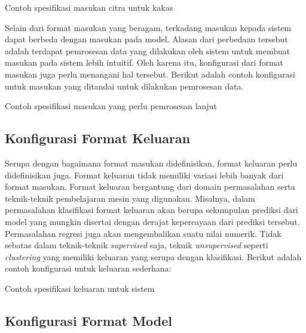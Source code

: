 \begin{listing}[H]
	\caption{Contoh spesifikasi masukan citra untuk kakas}
	\label{listing:2}
\end{listing}

Selain dari format masukan yang beragam, terkadang masukan kepada sistem dapat berbeda dengan masukan pada model.
Alasan dari perbedaan tersebut adalah terdapat pemrosesan data yang dilakukan oleh sistem untuk membuat masukan pada sistem lebih intuitif.
Oleh karena itu, konfigurasi dari format masukan juga perlu menangani hal tersebut.
Berikut adalah contoh konfigurasi untuk masukan yang ditandai untuk dilakukan pemrosesan data.

\begin{listing}[H]
	\caption{Contoh spesifikasi masukan yang perlu pemrosesan lanjut}
	\label{listing:3}
\end{listing}

\subsection{Konfigurasi Format Keluaran}\label{section:03-output-format}

Serupa dengan bagaimana format masukan didefinisikan, format keluaran perlu didefinisikan juga.
Format keluaran tidak memiliki variasi lebih banyak dari format masukan.
Format keluaran bergantung dari domain permasalahan serta teknik-teknik pembelajaran mesin yang digunakan.
Misalnya, dalam permasalahan klasifikasi format keluaran akan berupa sekumpulan prediksi dari model yang mungkin disertai dengan derajat kepercayaan dari prediksi tersebut.
Permasalahan regresi juga akan mengembalikan suatu nilai numerik.
Tidak sebatas dalam teknik-teknik \textit{supervised} saja, teknik \textit{unsupervised} seperti \textit{clustering} yang memiliki keluaran yang serupa dengan klasifikasi.
Berikut adalah contoh konfigurasi untuk keluaran sederhana:

\begin{listing}[H]
	\caption{Contoh spesifikasi keluaran untuk sistem}
	\label{listing:4}
\end{listing}

\subsection{Konfigurasi Format Model}\label{section:03-model-format}

